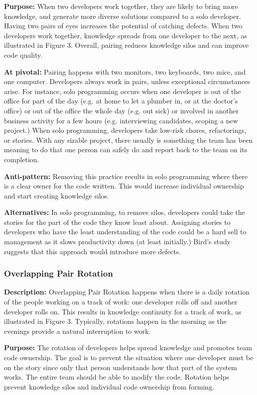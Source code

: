 \textbf{Purpose:} When two developers work together, they are likely to bring more knowledge, and generate more diverse solutions compared to a solo developer. Having two pairs of eyes increases the potential of catching defects. When two developers work together, knowledge spreads from one developer to the next, as illustrated in Figure 3. Overall, pairing reduces knowledge silos and can improve code quality.

\textbf{At pivotal:} Pairing happens with two monitors, two keyboards, two mice, and one computer. Developers always work in pairs, unless exceptional circumstances arise. For instance, solo programming occurs when one developer is out of the office for part of the day (e.g. at home to let a plumber in, or at the doctor's office) or out of the office the whole day (e.g. out sick) or involved in another business activity for a few hours (e.g. interviewing candidates, scoping a new project.) When solo programming, developers take low-risk chores, refactorings, or stories. With any sizable project, there usually is something the team has been meaning to do that one person can safely do and report back to the team on its completion.  

\textbf{Anti-pattern:} Removing this practice results in solo programming where there is a clear owner for the code written. This would increase individual ownership and start creating knowledge silos. 

\textbf{Alternatives:}  In solo programming, to remove silos, developers could take the stories for the part of the code they know least about. Assigning stories to developers who have the least understanding of the code could be a hard sell to management as it slows productivity down (at least initially.) Bird's study \cite{BirdDontTouchMyCode} suggests that this approach would introduce more defects. 

\subsubsection{Overlapping Pair Rotation}
\textbf{Description:} Overlapping Pair Rotation happens when there is a daily rotation of the people working on a track of work: one developer rolls off and another developer rolls on. This results in knowledge continuity for a track of work, as illustrated in Figure 3. Typically, rotations happen in the morning as the evenings provide a natural interruption to work. 

\textbf{Purpose:} The rotation of developers helps spread knowledge and promotes team code ownership. The goal is to prevent the situation where one developer must be on the story since only that person understands how that part of the system works. The entire team should be able to modify the code. Rotation helps prevent knowledge silos and individual code ownership from forming. 

